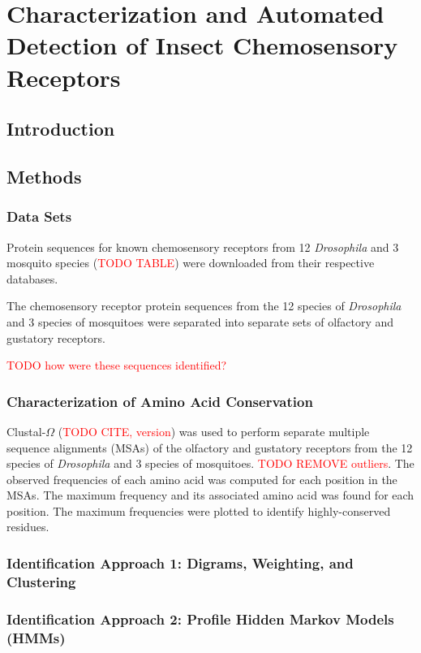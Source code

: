 \section{Characterization and Automated Detection of Insect Chemosensory Receptors}

\subsection{Introduction}

\subsection{Methods}

\subsubsection{Data Sets}

Protein sequences for known chemosensory receptors from 12 \emph{Drosophila} and 3 mosquito species (\textcolor{red}{TODO TABLE}) were downloaded from their respective databases.

The chemosensory receptor protein sequences from the 12 species of \emph{Drosophila} and 3 species of mosquitoes were separated into separate sets of olfactory and gustatory receptors.

\textcolor{red}{TODO how were these sequences identified?}

\subsubsection{Characterization of Amino Acid Conservation}
Clustal-$\Omega$ (\textcolor{red}{TODO CITE, version}) was used to perform separate multiple sequence alignments (MSAs) of the olfactory and gustatory receptors from the 12 species of \emph{Drosophila} and 3 species of mosquitoes.  \textcolor{red}{TODO REMOVE outliers}.  The observed frequencies of each amino acid was computed for each position in the MSAs.  The maximum frequency and its associated amino acid was found for each position.  The maximum frequencies were plotted to identify highly-conserved residues.

\subsubsection{Identification Approach 1: Digrams, Weighting, and Clustering}

\subsubsection{Identification Approach 2: Profile Hidden Markov Models (HMMs)}


